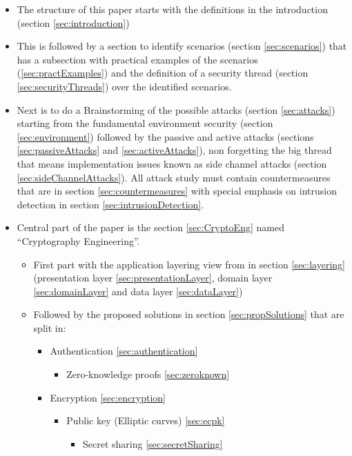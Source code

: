 \documentclass[10pt,a4paper,twoside]{llncs}
\begin{document}
\begin{itemize}
    \item The structure of this paper starts with the definitions in the introduction (section \ref{sec:introduction})
    \item This is followed by a section to identify scenarios (section \ref{sec:scenarios}) that has a subsection with practical examples of the scenarios (\ref{sec:practExamples}) and the definition of a security thread (section \ref{sec:securityThreads}) over the identified scenarios.
    \item Next is to do a Brainstorming of the possible attacks (section \ref{sec:attacks}) starting from the fundamental environment security (section \ref{sec:environment}) followed by the passive and active attacks (sections \ref{sec:passiveAttacks} and \ref{sec:activeAttacks}), non forgetting the big thread that means implementation issues known as side channel attacks (section \ref{sec:sideChannelAttacks}). All attack study must contain countermeasures that are in section \ref{sec:countermeasures} with special emphasis on intrusion detection in section \ref{sec:intrusionDetection}.
    \item Central part of the paper is the section \ref{sec:CryptoEng} named ``Cryptography Engineering''. 
    \begin{itemize}
        \item First part with the application layering view from \cite{TanenbaumDistr} in section \ref{sec:layering} (presentation layer \ref{sec:presentationLayer}, domain layer \ref{sec:domainLayer} and data layer \ref{sec:dataLayer})
        \item Followed by the proposed solutions in section \ref{sec:propSolutions} that are split in:
        \begin{itemize}
            \item Authentication \ref{sec:authentication}
            \begin{itemize}
                \item Zero-knowledge proofs \ref{sec:zeroknown}
            \end{itemize}
            \item Encryption \ref{sec:encryption}
            \begin{itemize}
                \item Public key (Elliptic curves) \ref{sec:ecpk}
                \begin{itemize}
                    \item Secret sharing \ref{sec:secretSharing}

\end{itemize}
\end{itemize}
\end{itemize}
\end{itemize}
\end{itemize}
\end{document}
